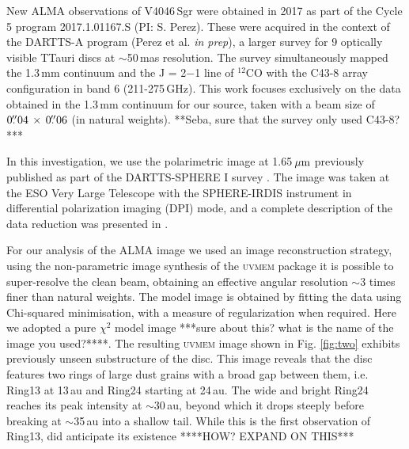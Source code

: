 \documentclass[letters,usenatbib,times]{mnras}
\begin{document}

New ALMA observations of V4046\,Sgr were obtained in 2017 as part of the Cycle 5 program 2017.1.01167.S (PI: S. Perez). These were acquired in the context of the DARTTS-A program (Perez et al. {\em in prep}), a larger survey for 9 optically visible TTauri discs at $\sim$50\,mas resolution. The survey simultaneously mapped the 1.3\,mm continuum and the J = 2$-$1 line of $^{12}$CO with the C43-8 array configuration in band 6 (211-275\,GHz). This work focuses exclusively on the data obtained in the 1.3\,mm continuum for our source, taken with a beam size of $0\hbox{$.\!\!^{\prime\prime}$}04 \,\times \, 0\hbox{$.\!\!^{\prime\prime}$}06$ (in natural weights). **Seba, sure that the survey only used C43-8?***

In this investigation, we use the  polarimetric image at 1.65\,$\hbox{$\mu$m}$ previously published as part of the DARTTS-SPHERE I survey \citep{Avenhaus_2018}. The image was taken at the ESO Very Large Telescope with the SPHERE-IRDIS instrument in differential polarization imaging (DPI) mode, and a complete description of the data reduction was presented in \citet{Avenhaus_2018}. 

For our analysis of the ALMA image we used an image reconstruction strategy, using the non-parametric image synthesis of the \textsc{uvmem} package \citep{2006ApJ...639..951C, 2018A&C....22...16C} it is possible to super-resolve the clean beam, obtaining an effective angular resolution $\sim$3 times finer than  natural weights. The model image is obtained by fitting the data using Chi-squared minimisation, with a measure of regularization when required. Here we adopted a pure $\chi^2$ model image ***sure about this? what is the name of the image you used?****. The resulting \textsc{uvmem} image shown in Fig. \ref{fig:two} exhibits previously unseen substructure of the disc. This image reveals that the disc features two rings of large dust grains with a broad gap between them, i.e. Ring13  at 13\,au and Ring24 starting at 24\,au. The wide and bright  Ring24  reaches its peak intensity at $\sim$30\,au, beyond which it drops steeply before breaking at  $\sim$35\,au into a  shallow tail. While this is the first observation of Ring13,  \citet{Ru_z_Rodr_guez_2019} did anticipate its existence ****HOW? EXPAND ON THIS***
\end{document}
